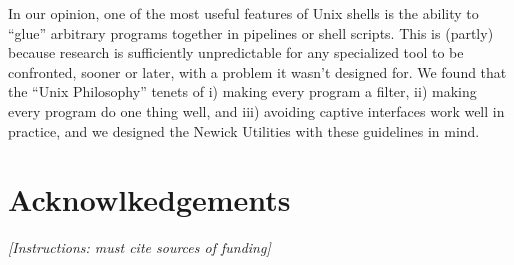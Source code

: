 \documentclass{bioinfo}
\begin{document}
In our opinion, one of the most useful features of Unix shells is the ability to  ``glue'' arbitrary programs together in pipelines or shell scripts. This is (partly) because research is sufficiently unpredictable for any specialized tool to be confronted, sooner or later, with a problem it wasn't designed for. We found that the ``Unix Philosophy'' tenets of i) making every program a filter, ii) making every program do one thing well, and iii) avoiding captive interfaces work well in practice, and we designed the Newick Utilities with these guidelines in mind. 

\section*{Acknowlkedgements}
\emph{[Instructions: must cite sources of funding]}

 

\end{document}
